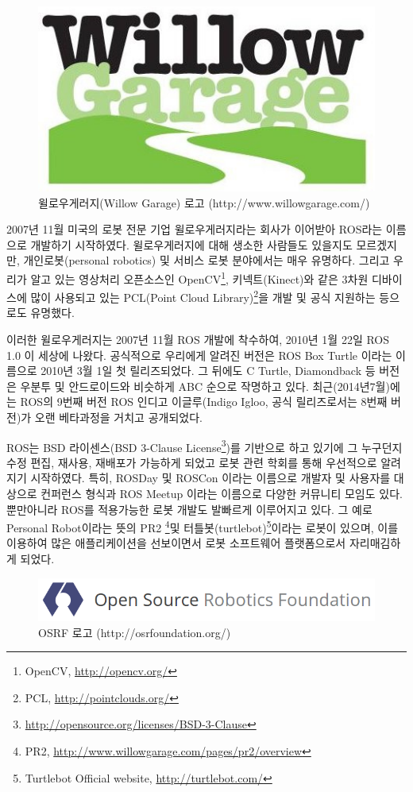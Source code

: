 \begin{figure}[h]
\centering\includegraphics[width=0.5\columnwidth]{pictures/chapter1/willow_garage_logo.jpg}
\caption{윌로우게러지(Willow Garage) 로고 (http://www.willowgarage.com/)}
\end{figure}

2007년 11월 미국의 로봇 전문 기업  윌로우게러지라는 회사가 이어받아 ROS라는 이름으로 개발하기 시작하였다. 윌로우게러지에 대해 생소한 사람들도 있을지도 모르겠지만, 개인로봇(personal robotics) 및 서비스 로봇 분야에서는 매우 유명하다. 그리고 우리가 알고 있는 영상처리 오픈소스인 OpenCV\footnote{OpenCV, \url{http://opencv.org/}}, 키넥트(Kinect)와 같은 3차원 디바이스에 많이 사용되고 있는 PCL(Point Cloud Library)\footnote{PCL, \url{http://pointclouds.org/}}을 개발 및 공식 지원하는 등으로도 유명했다. 

이러한 윌로우게러지는 2007년 11월 ROS 개발에 착수하여, 2010년 1월 22일 ROS 1.0 이 세상에 나왔다. 공식적으로 우리에게 알려진 버전은 ROS Box Turtle 이라는 이름으로 2010년 3월 1일 첫 릴리즈되었다. 그 뒤에도 C Turtle, Diamondback 등 버전은 우분투 및 안드로이드와 비슷하게 ABC 순으로 작명하고 있다. 최근(2014년7월)에는 ROS의 9번째 버전 ROS 인디고 이글루(Indigo Igloo, 공식 릴리즈로서는 8번째 버전)가 오랜 베타과정을 거치고 공개되었다. 

ROS는 BSD 라이센스(BSD 3-Clause License\footnote{\url{http://opensource.org/licenses/BSD-3-Clause}})를 기반으로 하고 있기에 그 누구던지 수정 편집, 재사용, 재배포가 가능하게 되었고 로봇 관련 학회를 통해 우선적으로 알려지기 시작하였다. 특히, ROSDay 및 ROSCon 이라는 이름으로 개발자 및 사용자를 대상으로 컨퍼런스 형식과 ROS Meetup 이라는 이름으로 다양한 커뮤니티 모임도 있다. 뿐만아니라 ROS를 적용가능한 로봇 개발도 발빠르게 이루어지고 있다. 그 예로 Personal Robot이라는 뜻의 PR2 \footnote{PR2, \url{http://www.willowgarage.com/pages/pr2/overview}}및 터틀봇(turtlebot)\footnote{Turtlebot Official website, \url{http://turtlebot.com/}}이라는 로봇이 있으며, 이를 이용하여 많은 애플리케이션을 선보이면서 로봇 소프트웨어 플랫폼으로서 자리매김하게 되었다. 

\begin{figure}[h]
\centering\includegraphics[width=\columnwidth]{pictures/chapter1/osrf_logo.png}
\caption{OSRF 로고 (http://osrfoundation.org/)}
\end{figure}

